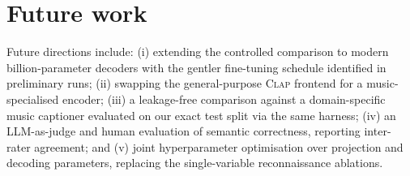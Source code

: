 \documentclass[9pt]{report}
\newcommand{\clapenc}{\textsc{Clap}}
\begin{document}
\section{Future work}

Future directions include: (i) extending the controlled comparison to modern
billion-parameter decoders with the gentler fine-tuning schedule identified in preliminary
runs; (ii) swapping the general-purpose \clapenc{} frontend for a music-specialised encoder;
(iii) a leakage-free comparison against a domain-specific music captioner evaluated on our
exact test split via the same harness; (iv) an LLM-as-judge and human evaluation of semantic
correctness, reporting inter-rater agreement; and (v) joint hyperparameter optimisation over
projection and decoding parameters, replacing the single-variable reconnaissance ablations.
\end{document}
